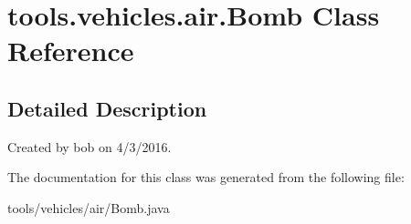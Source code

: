 \hypertarget{classtools_1_1vehicles_1_1air_1_1_bomb}{}\section{tools.\+vehicles.\+air.\+Bomb Class Reference}
\label{classtools_1_1vehicles_1_1air_1_1_bomb}


\subsection{Detailed Description}
Created by bob on 4/3/2016. 

The documentation for this class was generated from the following file\+:\begin{DoxyCompactItemize}
\item 
tools/vehicles/air/Bomb.\+java\end{DoxyCompactItemize}
